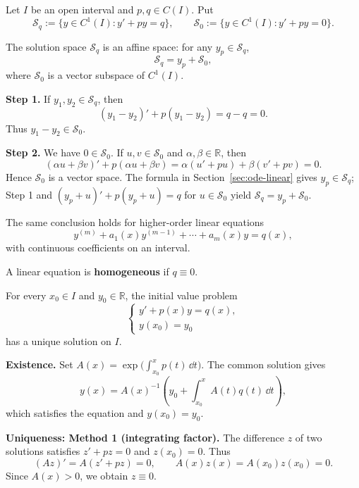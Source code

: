 Let $I$ be an open interval and $p,q\in C(I)$. Put
\[
    \mathcal S_q:=\{y\in C^1(I):y'+py=q\},
    \qquad \mathcal S_0:=\{y\in C^1(I):y'+py=0\}.
\]

\begin{theoremenv}\label{thm:ode-affine-solution-space}
The solution space $\mathcal S_q$ is an affine space:
for any $y_p\in\mathcal S_q$,
\[
    \mathcal S_q=y_p+\mathcal S_0,
\]
where $\mathcal S_0$ is a vector subspace of $C^1(I)$.
\end{theoremenv}

\begin{proofenv}
\textbf{Step 1.} If $y_1,y_2\in\mathcal S_q$, then
\[
    (y_1-y_2)'+p(y_1-y_2)=q-q=0.
\]
Thus $y_1-y_2\in\mathcal S_0$.

\textbf{Step 2.} We have $0\in\mathcal S_0$. If $u,v\in\mathcal S_0$
and $\alpha,\beta\in\mathbb R$, then
\[
    (\alpha u+\beta v)'+p(\alpha u+\beta v)
    =\alpha(u'+pu)+\beta(v'+pv)=0.
\]
Hence $\mathcal S_0$ is a vector space. The formula in
Section~\ref{sec:ode-linear} gives
$y_p\in\mathcal S_q$; Step 1 and
$(y_p+u)'+p(y_p+u)=q$ for $u\in\mathcal S_0$ yield
$\mathcal S_q=y_p+\mathcal S_0$.
\end{proofenv}

\begin{remark}
The same conclusion holds for higher-order linear equations
\[
    y^{(m)}+a_1(x)y^{(m-1)}+\cdots+a_m(x)y=q(x),
\]
with continuous coefficients on an interval.
\end{remark}

\begin{definitionenv}
A linear equation is \textbf{homogeneous} if $q\equiv0$.
\end{definitionenv}

\begin{theoremenv}\label{thm:ode-linear-ivp}
For every $x_0\in I$ and $y_0\in\mathbb R$, the initial value problem
\[
    \begin{cases}
        y'+p(x)y=q(x),\\
        y(x_0)=y_0
    \end{cases}
\]
has a unique solution on $I$.
\end{theoremenv}

\begin{proofenv}
\textbf{Existence.} Set $A(x)=\exp\bigl(\int_{x_0}^x p(t)\,\dd t\bigr)$.
The common solution gives
\[
    y(x)=A(x)^{-1}\left(y_0+\int_{x_0}^x A(t)q(t)\,\dd t\right),
\]
which satisfies the equation and $y(x_0)=y_0$.

\textbf{Uniqueness: Method 1 (integrating factor).}
The difference $z$ of two solutions satisfies
$z'+pz=0$ and $z(x_0)=0$. Thus
\[
    (Az)'=A(z'+pz)=0,
    \qquad A(x)z(x)=A(x_0)z(x_0)=0.
\]
Since $A(x)>0$, we obtain $z\equiv0$.
\end{proofenv}

